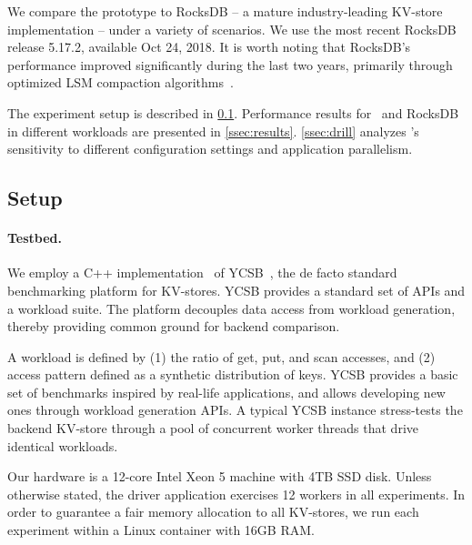 We  compare the \sys\/ prototype to RocksDB -- a mature industry-leading KV-store implementation  -- under a variety of scenarios.  We use the most recent RocksDB release 5.17.2, available Oct 24, 2018.  
It is worth noting that RocksDB's performance improved significantly during the last two years, primarily through 
optimized LSM compaction algorithms~\cite{CallaghanCompaction}.   

The experiment setup is described in \cref{ssec:setup}. 
Performance results for \sys\ and RocksDB in 
different workloads are presented in \cref{ssec:results}. 
\cref{ssec:drill} analyzes \sys's sensitivity to different configuration settings and application parallelism.
 

\subsection{Setup}
\label{ssec:setup} 

\paragraph{Testbed.} We employ a C++ implementation~\cite{Cpp-YCSB} of YCSB~\cite{YCSB}, the  de facto standard  
benchmarking platform for KV-stores. 
YCSB provides a standard set of APIs and a workload suite. 
The platform decouples data access from workload generation, 
thereby providing common ground for backend comparison. 

A workload is defined by  (1) the ratio of get, put, and scan accesses, and (2) access pattern defined as a synthetic distribution of keys. 
YCSB provides a basic set of benchmarks  inspired by real-life applications, and allows developing new ones through workload 
generation APIs. A typical YCSB instance stress-tests the backend KV-store through a pool of concurrent worker threads that drive identical
workloads. %

Our hardware is a 12-core Intel Xeon 5 machine with 4TB SSD disk. Unless otherwise stated, the driver application 
exercises 12 workers in all experiments. In order to guarantee a fair memory allocation to all KV-stores, we run each 
experiment within a Linux container with 16GB RAM. 

